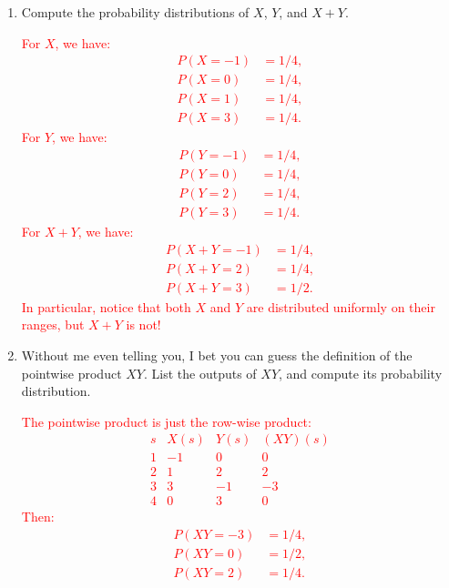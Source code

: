 \documentclass[12pt,reqno]{amsart}
\begin{document}
\medskip
\begin{enumerate}
\item Compute the probability distributions of $X$, $Y$, and $X+Y$.

\bigskip
\textcolor{red}{
For $X$, we have:
	\begin{align*}
	P(X=-1) &= 1/4, \\
	P(X=0) &= 1/4, \\
	P(X=1) &= 1/4, \\
	P(X=3) &= 1/4.
        \end{align*}
For $Y$, we have:
	\begin{align*}
	P(Y = -1) &= 1/4, \\
	P(Y = 0) &= 1/4, \\
	P(Y = 2) &= 1/4, \\
	P(Y=3) &= 1/4.
	\end{align*}
For $X+Y$, we have:
	\begin{align*}
	P(X+Y = -1) &= 1/4, \\
	P(X+Y = 2) &= 1/4, \\
	P(X+Y = 3) &= 1/2.
	\end{align*}
   In particular, notice that both $X$ and $Y$ are distributed uniformly on their ranges, but $X+Y$ is not!}
\bigskip

\item Without me even telling you, I bet you can guess the definition of the pointwise product $XY$. List the outputs of $XY$, and compute its probability distribution.
    
\bigskip
\textcolor{red}{The pointwise product is just the row-wise product:
    	\[
	\begin{array}{c|ccc}
	s & X(s) & Y(s) & (XY)(s) \\ \hline
	1 & -1 & 0 & 0 \\
	2 & 1 & 2 & 2 \\
	3 & 3 & -1 & -3 \\
	4 & 0 & 3 & 0
	\end{array}
	\]
Then:
	\begin{align*}
	P(XY = -3) &= 1/4, \\
	P(XY = 0) &= 1/2, \\
	P(XY = 2) &= 1/4.
	\end{align*}}
\end{enumerate}
    
\end{document}
